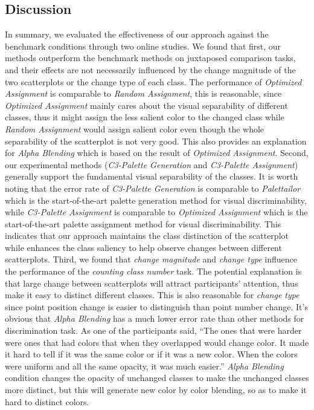 \subsection{Discussion}
In summary, we evaluated the effectiveness of our approach against the benchmark conditions through two online studies. 
We found that first, our methods outperform the benchmark methods on juxtaposed comparison tasks, and their effects are not necessarily influenced by the change magnitude of the two scatterplots or the change type of each class. 
The performance of \emph{Optimized Assignment} is comparable to \emph{Random Assignment}, this is reasonable, since \emph{Optimized Assignment} mainly cares about the visual separability of different classes, thus it might assign the less salient color to the changed class while \emph{Random Assignment} would assign salient color even though the whole separability of the scatterplot is not very good. This also provides an explanation for \emph{Alpha Blending} which is based on the result of \emph{Optimized Assignment}.
Second, our experimental methods (\emph{C3-Palette Generation} and \emph{C3-Palette Assignment}) generally support the fundamental visual separability of the classes. It is worth noting that the error rate of \emph{C3-Palette Generation} is comparable to \emph{Palettailor} which is the start-of-the-art palette generation method for visual discriminability, while \emph{C3-Palette Assignment} is comparable to \emph{Optimized Assignment} which is the start-of-the-art palette assignment method for visual discriminability. This indicates that our approach maintains the class distinction of the scatterplot while enhances the class saliency to help observe changes between different scatterplots.
Third, we found that \emph{change magnitude} and \emph{change type} influence the performance of the \emph{counting class number} task. The potential explanation is that large change between scatterplots will attract participants' attention, thus make it easy to distinct different classes. This is also reasonable for \emph{change type} since point position change is easier to distinguish than point number change.
It's obvious that \emph{Alpha Blending} has a much lower error rate than other methods for discrimination task. As one of the participants said, ``The ones that were harder were ones that had colors that when they overlapped would change color. It made it hard to tell if it was the same color or if it was a new color. When the colors were uniform and all the same opacity, it was much easier.'' \emph{Alpha Blending} condition changes the opacity of unchanged classes to make the unchanged classes more distinct, but this will generate new color by color blending, so as to make it hard to distinct colors.

